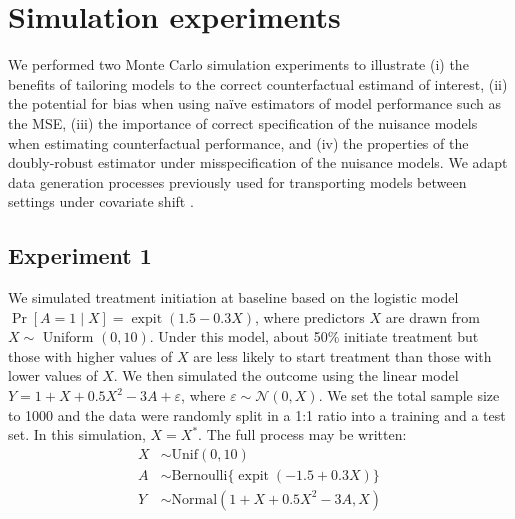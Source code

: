 \section{Simulation experiments} \label{sec:simulation}
We performed two Monte Carlo simulation experiments to illustrate (i) the benefits of tailoring models to the correct counterfactual estimand of interest, (ii) the potential for bias when using na\"{i}ve estimators of model performance such as the MSE, (iii) the importance of correct specification of the nuisance models when estimating counterfactual performance, and (iv) the properties of the doubly-robust estimator under misspecification of the nuisance models. We adapt data generation processes previously used for transporting models between settings under covariate shift \cite{steingrimsson_transporting_2023, morrison_robust_2022}.

\subsection{Experiment 1}
We simulated treatment initiation at baseline based on the logistic model $\Pr[A=1 \mid X]=\operatorname{expit} (1.5-0.3 X)$, where predictors $X$ are drawn from $X \sim$ Uniform $(0,10)$. Under this model, about 50\% initiate treatment but those with higher values of $X$ are less likely to start treatment than those with lower values of $X$. We then simulated the outcome using the linear model $Y=1+X+0.5 X^2- 3A + \varepsilon$, where $\varepsilon \sim \mathcal{N}(0, X)$.  We set the total sample size to 1000 and the data were randomly split in a 1:1 ratio into a training and a test set. In this simulation, $X = X^*$. The full process may be written:
\begin{align*}
    X & \sim \text{Unif}(0, 10) \\
    A & \sim \text{Bernoulli}\{\operatorname{expit}(-1.5 + 0.3 X)\} \\
    Y & \sim \text{Normal}(1 + X + 0.5 X^2 - 3 A, X)
\end{align*}    
 

